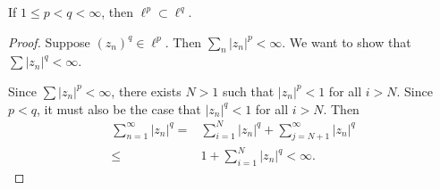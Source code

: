 \documentclass[12pt]{article}
\begin{document}
\begin{proposition}
	If $1\leq p < q < \infty$, then $\ell^p\subset\ell^q$.
\end{proposition}
\begin{proof}
	Suppose $(z_n)^q\in\ell^p$. Then $\sum_n |z_n|^p<\infty$. We want to show that $\sum |z_n|^q<\infty$.

	Since $\sum |z_n|^p<\infty$, there exists $N>1$ such that $|z_n|^p<1$ for all $i>N$. Since $p<q$, it must also be the case that $|z_n|^q<1$ for all $i>N$. Then 
	\begin{align*}
		\sum_{n=1}^\infty |z_n|^q 
		=& \sum_{i=1}^N |z_n|^q + \sum_{j=N+1}^\infty |z_n|^q \\
		\leq& 1 + \sum_{i=1}^N |z_n|^q < \infty.
	\end{align*}
\end{proof}

\end{document}
